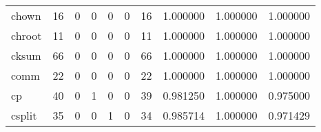\begin{tabular}{lrrrrrrrrr}
chown     &                                      16 &                                                  0 &                                                  0 &                                                  0 &                                                  0 &                                                 16 &                                           1.000000 &                               1.000000 &                             1.000000 \\
chroot    &                                      11 &                                                  0 &                                                  0 &                                                  0 &                                                  0 &                                                 11 &                                           1.000000 &                               1.000000 &                             1.000000 \\
cksum     &                                      66 &                                                  0 &                                                  0 &                                                  0 &                                                  0 &                                                 66 &                                           1.000000 &                               1.000000 &                             1.000000 \\
comm      &                                      22 &                                                  0 &                                                  0 &                                                  0 &                                                  0 &                                                 22 &                                           1.000000 &                               1.000000 &                             1.000000 \\
cp        &                                      40 &                                                  0 &                                                  1 &                                                  0 &                                                  0 &                                                 39 &                                           0.981250 &                               1.000000 &                             0.975000 \\
csplit    &                                      35 &                                                  0 &                                                  0 &                                                  1 &                                                  0 &                                                 34 &                                           0.985714 &                               1.000000 &                             0.971429 \\

\end{tabular}
